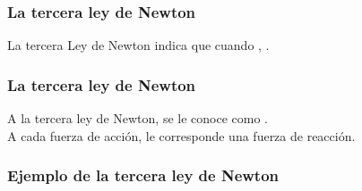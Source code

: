 \documentclass[14pt]{beamer}
\begin{document}
\begin{frame}
\frametitle{La tercera ley de Newton}
La tercera Ley de Newton indica que cuando , \pause {}.
\end{frame}
\begin{frame}
\frametitle{La tercera ley de Newton}
A la tercera ley de Newton, se le conoce como \pause {}.
\\
\bigskip
\pause
A cada fuerza de acción, le corresponde una fuerza de reacción.
\end{frame}
\begin{frame}
\frametitle{Ejemplo de la tercera ley de Newton}
\begin{figure}
    \centering

\end{figure}
\end{frame}
\end{document}
